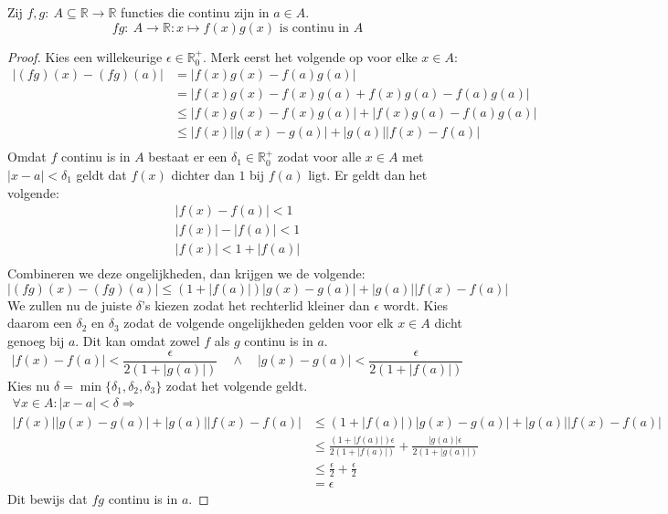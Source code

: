 \documentclass[main.tex]{subfiles}
\begin{document}
\begin{bpr}
  \label{pr:product-continu}
  Zij $f,g:\ A \subseteq \mathbb{R} \rightarrow \mathbb{R}$ functies die continu zijn in $a\in A$.
  \[ fg:\ A \rightarrow \mathbb{R}: x \mapsto f(x)g(x) \text{ is continu in } A \]

  \begin{proof}
    Kies een willekeurige $\epsilon \in \mathbb{R}_{0}^{+}$.
    Merk eerst het volgende op voor elke $x\in A$:
    \[
    \begin{array}{rl}
    |(fg)(x) - (fg)(a)| &= |f(x)g(x) - f(a)g(a)|\\
                        &= |f(x)g(x) - f(x)g(a) + f(x)g(a) - f(a)g(a)|\\
                        &\le |f(x)g(x) - f(x)g(a)| + |f(x)g(a) - f(a)g(a)|\\
                        &\le |f(x)||g(x)-g(a)| + |g(a)||f(x)-f(a)|\\
    \end{array}
    \]
    Omdat $f$ continu is in $A$ bestaat er een $\delta_{1} \in \mathbb{R}_{0}^{+}$ zodat voor alle $x\in A$ met $|x-a|<\delta_{1}$ geldt dat $f(x)$ dichter dan $1$ bij $f(a)$ ligt.
    Er geldt dan het volgende:
    \[
    \begin{array}{c}
      |f(x)-f(a)|<1\\
      |f(x)|-|f(a)|<1\\
      |f(x)|<1+|f(a)|\\
    \end{array}
    \]
    Combineren we deze ongelijkheden, dan krijgen we de volgende:
    \[ |(fg)(x) - (fg)(a)| \le (1+|f(a)|)|g(x)-g(a)| + |g(a)||f(x)-f(a)| \]
    We zullen nu de juiste $\delta$'s kiezen zodat het rechterlid kleiner dan $\epsilon$ wordt.
    Kies daarom een $\delta_{2}$ en $\delta_{3}$ zodat de volgende ongelijkheden gelden voor elk $x\in A$ dicht genoeg bij $a$.
    Dit kan omdat zowel $f$ als $g$ continu is in $a$.
    \[ 
    |f(x)-f(a)| < \frac{\epsilon}{2(1+|g(a)|)} \quad\wedge\quad |g(x)-g(a)| < \frac{\epsilon}{2(1+|f(a)|)}
    \]
    Kies nu $\delta = \min\{\delta_{1},\delta_{2},\delta_{3}\}$ zodat het volgende geldt.
    \[ 
    \begin{array}{rl}
    \forall x\in A: |x-a|<\delta \Rightarrow \\
    |f(x)||g(x)-g(a)| + |g(a)||f(x)-f(a)| &\le (1+|f(a)|)|g(x)-g(a)| + |g(a)||f(x)-f(a)|\\
                                          &\le \frac{(1+|f(a)|)\epsilon}{2(1+|f(a)|)} + \frac{|g(a)|\epsilon}{2(1+|g(a)|)}\\
                                          &\le \frac{\epsilon}{2} + \frac{\epsilon}{2}\\
                                          &= \epsilon
    \end{array}
    \]
    Dit bewijs dat $fg$ continu is in $a$.
  \end{proof}
\end{bpr}
\end{document}
